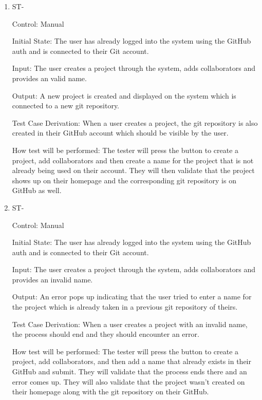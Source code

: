 \documentclass[12pt, titlepage]{article}
\newcounter{TESTID}
\newcommand\TESTNUM{\stepcounter{TESTID}\theTESTID}
\begin{document}
	\begin{enumerate}
		
		\item{ST-\TESTNUM\\}
		
		Control: Manual
		
		Initial State: The user has already logged into the system using the GitHub auth and is connected to their Git account. 
		
		Input: The user creates a project through the system, adds collaborators and provides an valid name. 
		
		Output: A new project is created and displayed on the system which is connected to a new git repository. 
		
		Test Case Derivation: When a user creates a project, the git repository is also created in their GitHub account which should be visible by the user. 
		
		How test will be performed: The tester will press the button to create a project, add collaborators and then create a name for the project that is not already being used on their account. They will then validate that the project shows up on their homepage and the corresponding git repository is on GitHub as well.
		
		\item{ST-\TESTNUM\\}
		
		Control: Manual
		
		Initial State: The user has already logged into the system using the GitHub auth and is connected to their Git account. 
		
		Input: The user creates a project through the system, adds collaborators and provides an invalid name. 
		
		Output: An error pops up indicating that the user tried to enter a name for the project which is already taken in a previous git repository of theirs. 
		
		Test Case Derivation: When a user creates a project with an invalid name, the process should end and they should encounter an error.
		
		How test will be performed: The tester will press the button to create a project, add collaborators, and then add a name that already exists in their GitHub and submit. They will validate that the process ends there and an error comes up. They will also validate that the project wasn't created on their homepage along with the git repository on their GitHub.
		

\end{enumerate}
\end{document}
